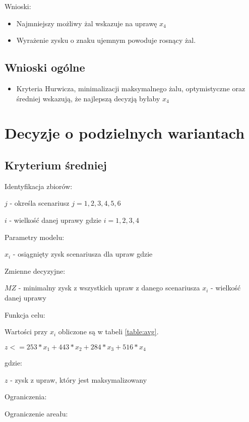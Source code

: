 \documentclass{article}
\begin{document}
Wnioski:

\begin{itemize}
  \item Najmniejszy możliwy żal wskazuje na uprawę $x_4$
  \item Wyrażenie zysku o znaku ujemnym powoduje rosnący żal.
\end{itemize}

\subsection{Wnioski ogólne}

\begin{itemize}
  \item Kryteria Hurwicza, minimalizacji maksymalnego żalu, optymistyczne oraz średniej wskazują, że najlepszą decyzją byłaby $x_4$
\end{itemize}




\section{Decyzje o podzielnych wariantach}

\subsection{Kryterium średniej}

\noindent
Identyfikacja zbiorów:

$j$ - określa scenariusz $j = {1,2,3,4,5,6}$

$i$ - wielkość danej uprawy gdzie $i = {1,2,3,4}$

\noindent
Parametry modelu:

$x_i$ - osiągnięty zysk scenariusza dla upraw gdzie

\noindent
Zmienne decyzyjne:

$MZ$ - minimalny zysk z wszystkich upraw z danego scenariusza
$x_i$ - wielkość danej uprawy

\noindent
Funkcja celu:

Wartości przy $x_i$ obliczone są w tabeli \ref{table:avg}.

$z <= 253 * x_1 + 443 * x_2 + 284 * x_3 + 516 * x_4$ 

gdzie:

$z$ - zysk z upraw, który jest maksymalizowany

\noindent
Ograniczenia:

\noindent
Ograniczenie areału:
\end{document}
